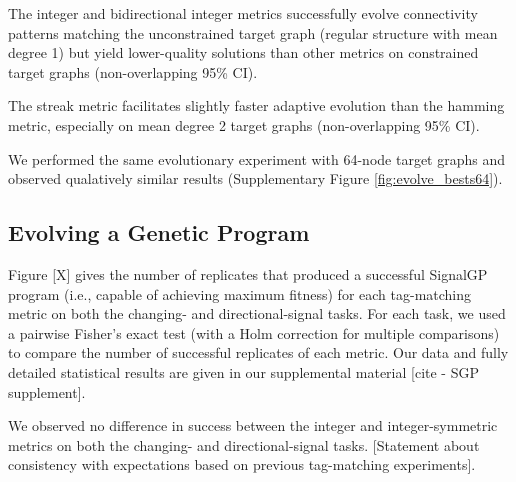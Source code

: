 \begin{enumerate}
The integer and bidirectional integer metrics successfully evolve connectivity patterns matching the unconstrained target graph (regular structure with mean degree 1) but yield lower-quality solutions than other metrics on constrained target graphs (non-overlapping 95\% CI).

The streak metric facilitates slightly faster adaptive evolution than the hamming metric, especially on mean degree 2 target graphs (non-overlapping 95\% CI).

We performed the same evolutionary experiment with 64-node target graphs and observed qualatively similar results (Supplementary Figure \ref{fig:evolve_bests64}).

\subsection{Evolving a Genetic Program}




Figure [X] gives the number of replicates that produced a successful SignalGP program (i.e., capable of achieving maximum fitness) for each tag-matching metric on both the changing- and directional-signal tasks.
For each task, we used a pairwise Fisher's exact test (with a Holm correction for multiple comparisons) to compare the number of successful replicates of each metric.
Our data and fully detailed statistical results are given in our supplemental material [cite - SGP supplement].

We observed no difference in success between the integer and integer-symmetric metrics on both the changing- and directional-signal tasks.
[Statement about consistency with expectations based on previous tag-matching experiments].


\end{enumerate}
